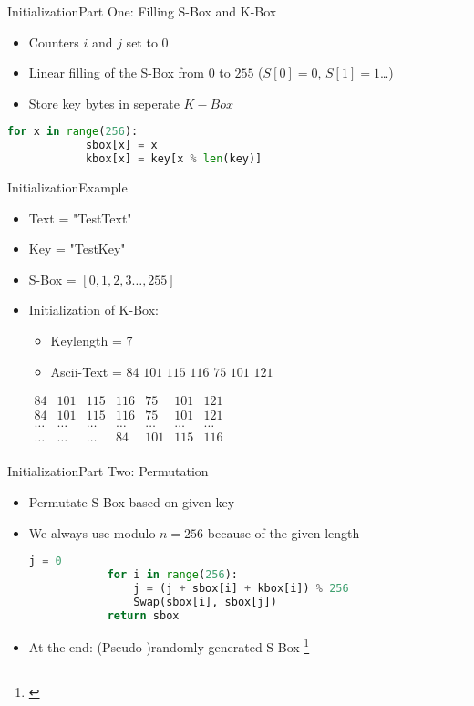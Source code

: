 \documentclass[
	aspectratio=169,	%
	onlytextwidth,		%
	t					%
	]{beamer}
\begin{document}
\begin{frame}[fragile]{Initialization}{Part One: Filling S-Box and K-Box}
	\begin{itemize}
		\item Counters $i$ and $j$ set to $0$
		\item Linear filling of the S-Box from $0$ to $255$ ($S[0] = 0$, $S[1] = 1$\dots)
		\item Store key bytes in seperate $K-Box$
	\end{itemize}
	\begin{lstlisting}[language=Python]
		for x in range(256):
			sbox[x] = x
			kbox[x] = key[x % len(key)]
	\end{lstlisting}
\end{frame}


\begin{frame}{Initialization}{Example}
	\begin{itemize}
		\item Text = "TestText"
		\item Key = "TestKey"
		\item S-Box = $[0, 1, 2, 3 \dots, 255]$
		\item Initialization of K-Box:
		\begin{itemize}
			\item Keylength = 7
			\item Ascii-Text = $84$ $101$ $115$ $116$ $75$ $101$ $121$
		\end{itemize}
		\medskip
		$\begin{array}{|ccccccc|}
		84 & 101 & 115 & 116 & 75 & 101 & 121 \\
		84 & 101 & 115 & 116 & 75 & 101 & 121 \\
		\dots & \dots & \dots & \dots & \dots & \dots & \dots \\
		\dots & \dots & \dots & 84 & 101 & 115 & 116 \\
		\end{array}$
	\end{itemize}
\end{frame}


\begin{frame}[fragile]{Initialization}{Part Two: Permutation}
	\begin{itemize}
		\item Permutate S-Box based on given key
		\item We always use modulo $n = 256$ because of the given length
		\begin{lstlisting}[language=Python]
			j = 0
			for i in range(256):
				j = (j + sbox[i] + kbox[i]) % 256
				Swap(sbox[i], sbox[j])
			return sbox
		\end{lstlisting}
		\item At the end: (Pseudo-)randomly generated S-Box \footnote[frame]{\cite{woungang20192nd}}
	\end{itemize}
\end{frame}
\end{document}
